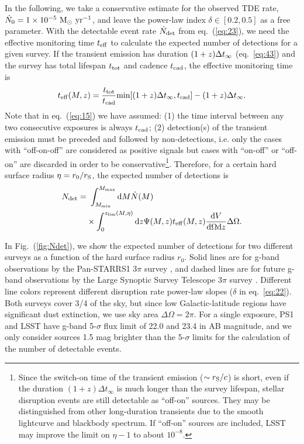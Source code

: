 \documentclass[useAMS,usenatbib]{mn2e}
\def\mt{\mathrm}
\begin{document}
In the following, we take a conservative estimate for the
  observed TDE rate, $\dot{N}_0 =
1\times10^{-5} \rm\ M_{\rm\odot}\ yr^{-1}$, and leave
the power-law index $\delta\in [0.2, 0.5]$ as a free parameter.
With the detectable event rate $\dot{N}_{\rm det}$ from
eq.~(\ref{eq:23}), we need the effective monitoring time $t_{\rm eff}$ to
calculate the expected number of detections for a given
survey. If the transient emission has duration $(1+z)\Delta t_{\rm
  \infty}$ (eq.~\ref{eq:43}) and the survey has total lifespan $t_{\rm
  tot}$ and cadence $t_{\rm cad}$, the effective monitoring time is
\begin{equation}
  \label{eq:15}
  t_{\rm eff}(M, z) = \frac{t_{\rm tot}}{t_{\rm cad}}
  \mbox{min}[(1+z)\Delta t_{\infty}, t_{\rm cad}] - (1+z) \Delta t_{\infty}.
\end{equation}
Note that in eq.~(\ref{eq:15}) we have assumed: (1) the time interval
between any two consecutive exposures is always $t_{\rm cad}$; (2)
detection(s) of the transient emission must be preceded and followed by
non-detections, i.e. only the cases with ``off-on-off'' are considered
as positive signals but cases with ``on-off'' or ``off-on'' are
discarded in order to be
conservative\footnote{Since the switch-on time of the transient emission
  ($\sim r_{\rm S}/c$) is short, even if the duration $(1+z) \Delta
  t_{\infty}$ is much longer than the survey lifespan, stellar
  disruption events are still detectable as ``off-on''
  sources. They may be distinguished from other long-duration
  transients due to the smooth lightcurve and blackbody spectrum. If
  ``off-on'' sources are included, LSST may improve the limit on
  $\eta-1$ to about $10^{-8}$.}. 
Therefore, for a certain hard surface radius $\eta =
r_0/r_{\rm S}$, the expected number of detections is
\begin{equation}
  \label{eq:19}
  \begin{split}
        N_{\rm det} =&\ \int_{M_{\rm min}}^{M_{\rm max}}\mt{d} M \dot{N}(M) \\
  &\times\int_0^{z_{\rm lim}(M, \eta)}\mt{d}z \Psi(M, z)  t_{\rm eff}(M, z)
  \frac{\mt{d}V}{\mt{d}\Omega 
    \mt{d} z} \Delta \Omega. 
  \end{split}
\end{equation}

In Fig.~(\ref{fig:Ndet}), we show the expected number of detections for two
different surveys as a function of the hard surface radius
$r_0$. Solid lines are for g-band observations by the Pan-STARRS1 3$\pi$ survey 
\citep[PS1,][]{2010SPIE.7733E..0EK, 2013ApJ...770..128I,  
2016arXiv161205560C}, and dashed lines are for future g-band observations by the
Large Synoptic Survey Telescope 3$\pi$ survey 
\citep[LSST,][]{2008arXiv0805.2366I}. Different line 
colors represent different disruption rate power-law slopes
($\delta$ in eq.~\ref{eq:22}). Both surveys cover 3/4 of the sky, but
since low Galactic-latitude regions have significant dust extinction,
we use sky area $\Delta\Omega = 2\pi$. For a single exposure, PS1 and
LSST have g-band 5-$\sigma$ flux limit of 22.0 and 23.4 in AB magnitude,
and we only consider sources 1.5 mag brighter than the 5-$\sigma$
limits for the calculation of the number of detectable events.
\end{document}
